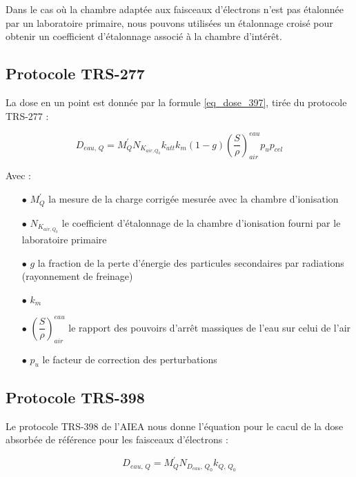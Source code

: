 \documentclass{article}
\begin{document}
Dans le cas où la chambre adaptée aux faisceaux d'électrons n'est pas étalonnée par un laboratoire primaire, nous pouvons utilisées un étalonnage croisé pour obtenir un coefficient d'étalonnage associé à la chambre d'intérêt.

\subsection{Protocole TRS-277}

La dose en un point est donnée par la formule \ref*{eq_dose_397}, tirée du protocole TRS-277 :

\begin{equation}
  D_{eau,\, Q} = M_Q^{'} N_{K_{air, Q_0}} k_{att} k_m (1-g) \left( \dfrac{S}{\rho} \right)^{eau}_{air} p_u p_{cel}
  \label{eq_dose_397}
\end{equation}

Avec :

\begin{itemize}
  \item[$\bullet$] $M_Q^{'}$ la mesure de la charge corrigée mesurée avec la chambre d'ionisation 
  \item[$\bullet$] $N_{K_{air, Q_0}}$ le coefficient d'étalonnage de la chambre d'ionisation fourni par le laboratoire primaire
  \item[$\bullet$] $g$ la fraction de la perte d'énergie des particules secondaires par radiations (rayonnement de freinage)
  \item[$\bullet$] $k_m$ 
  \item[$\bullet$] $\left( \dfrac{S}{\rho} \right)^{eau}_{air}$ le rapport des pouvoirs d'arrêt massiques de l'eau sur celui de l'air
  \item[$\bullet$] $p_u$ le facteur de correction des perturbations
\end{itemize}

\subsection{Protocole TRS-398}

Le protocole TRS-398 de l'AIEA \cite{international2001iaea} nous donne l'équation pour le cacul de la dose absorbée de référence pour les faisceaux d'électrons :

\begin{equation}
  D_{eau, \, Q} = M_Q^{'} N_{D_{eau}, \, Q_0} k_{Q,\, Q_0}
  \label{eq_dose_398}
\end{equation}
\end{document}
